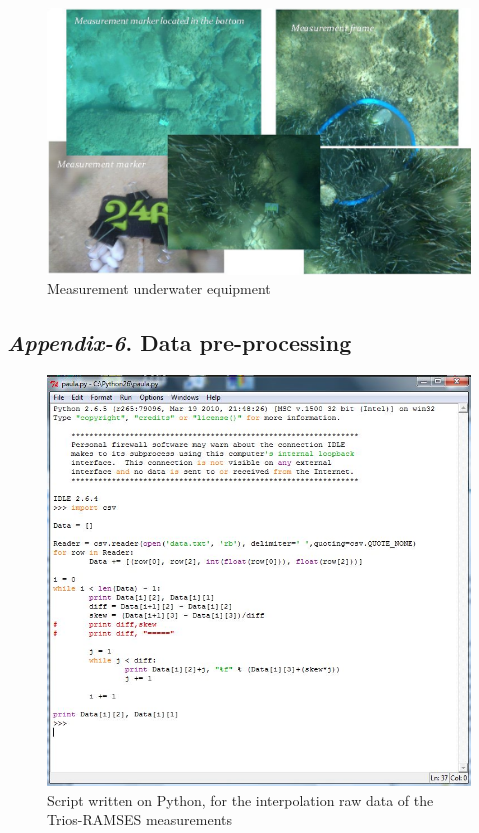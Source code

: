 \documentclass[10pt, a4paper]{article}
\begin{document}
\begin{appendices}
\begin{figure}[h]
	\begin{center}
		\includegraphics[scale=0.35]{Fig-3-16.jpg}
		\caption{Measurement underwater equipment}\label{fig:A.7}		
	\end{center}
\end{figure}
\pagebreak

\subsection{\textit{Appendix-6}. Data pre-processing}

\begin{figure}[H]
	\centering
	\includegraphics[scale=0.5]{Fig-24.jpg}
	\caption{Script written on Python, for the interpolation raw data of the Trios-RAMSES measurements}
	\label{fig:A.8}
\end{figure}
\pagebreak


\end{appendices}
\end{document}

